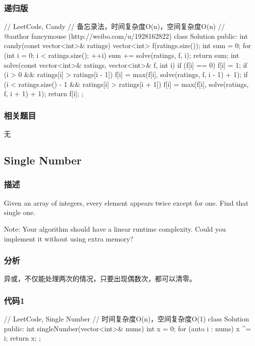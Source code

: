 \subsubsection{递归版}
\begin{Code}
// LeetCode, Candy
// 备忘录法，时间复杂度O(n)，空间复杂度O(n)
// @author fancymouse (http://weibo.com/u/1928162822)
class Solution {
public:
    int candy(const vector<int>& ratings) {
        vector<int> f(ratings.size());
        int sum = 0;
        for (int i = 0; i < ratings.size(); ++i)
            sum += solve(ratings, f, i);
        return sum;
    }
    int solve(const vector<int>& ratings, vector<int>& f, int i) {
        if (f[i] == 0) {
            f[i] = 1;
            if (i > 0 && ratings[i] > ratings[i - 1])
                f[i] = max(f[i], solve(ratings, f, i - 1) + 1);
            if (i < ratings.size() - 1 && ratings[i] > ratings[i + 1])
                f[i] = max(f[i], solve(ratings, f, i + 1) + 1);
        }
        return f[i];
    }
};
\end{Code}


\subsubsection{相关题目}
\begindot
\item 无
\myenddot


\subsection{Single Number} %
\label{sec:single-number}


\subsubsection{描述}
Given an array of integers, every element appears twice except for one. Find that single one.

Note:
Your algorithm should have a linear runtime complexity. Could you implement it without using extra memory?


\subsubsection{分析}
异或，不仅能处理两次的情况，只要出现偶数次，都可以清零。


\subsubsection{代码1}
\begin{Code}
// LeetCode, Single Number
// 时间复杂度O(n)，空间复杂度O(1)
class Solution {
public:
    int singleNumber(vector<int>& nums) {
        int x = 0;
        for (auto i : nums) {
            x ^= i;
        }
        return x;
    }
};
\end{Code}


